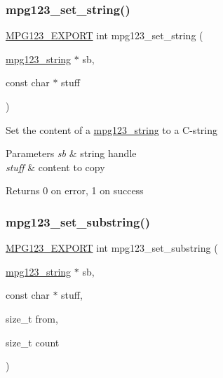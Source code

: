 \subsubsection{\texorpdfstring{mpg123\_set\_string()}{mpg123\_set\_string()}}
{\footnotesize\ttfamily \mbox{\hyperlink{mpg123_8h_a2ba98cfba3f760879df70e755b2a61cc}{M\+P\+G123\+\_\+\+E\+X\+P\+O\+RT}} int mpg123\+\_\+set\+\_\+string (\begin{DoxyParamCaption}\item[{\mbox{\hyperlink{structmpg123__string}{mpg123\+\_\+string}} $\ast$}]{sb,  }\item[{const char $\ast$}]{stuff }\end{DoxyParamCaption})}

Set the content of a \mbox{\hyperlink{structmpg123__string}{mpg123\+\_\+string}} to a C-\/string 
\begin{DoxyParams}{Parameters}
{\em sb} & string handle \\
\hline
{\em stuff} & content to copy \\
\hline
\end{DoxyParams}
\begin{DoxyReturn}{Returns}
0 on error, 1 on success 
\end{DoxyReturn}
\mbox{\label{group__mpg123__metadata_ga37b68d834755647a4ef227b0dd4b5c2a}} 
\subsubsection{\texorpdfstring{mpg123\_set\_substring()}{mpg123\_set\_substring()}}
{\footnotesize\ttfamily \mbox{\hyperlink{mpg123_8h_a2ba98cfba3f760879df70e755b2a61cc}{M\+P\+G123\+\_\+\+E\+X\+P\+O\+RT}} int mpg123\+\_\+set\+\_\+substring (\begin{DoxyParamCaption}\item[{\mbox{\hyperlink{structmpg123__string}{mpg123\+\_\+string}} $\ast$}]{sb,  }\item[{const char $\ast$}]{stuff,  }\item[{size\+\_\+t}]{from,  }\item[{size\+\_\+t}]{count }\end{DoxyParamCaption})}

